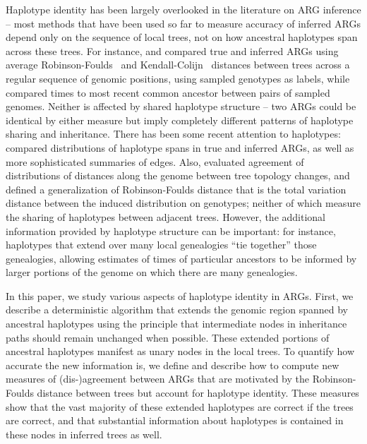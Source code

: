 \documentclass[10pt,twoside,lineno]{gsajnl}
\begin{document}
Haplotype identity has been largely overlooked in the literature on ARG inference --
most methods that have been used so far to measure accuracy of inferred ARGs
depend only on the sequence of local trees,
not on how ancestral haplotypes span across these trees.
For instance, \citet{kelleher2019inferring} and \citet{zhang2023biobankscale}
compared true and inferred ARGs
using average Robinson-Foulds~\citep{robinson1981comparison} and 
Kendall-Colijn~\citep{kendall2016mapping} distances between trees
across a regular sequence of genomic positions,
using sampled genotypes as labels,
while \citet{brandt2022evaluation} compared times to most recent common ancestor
between pairs of sampled genomes.
Neither is affected by shared haplotype structure --
two ARGs could be identical by either measure
but imply completely different patterns of haplotype sharing and inheritance.
There has been some recent attention to haplotypes:
\citet{ignatieva2024length} compared distributions of haplotype spans in true and inferred ARGs,
as well as more sophisticated summaries of edges.
Also, \citet{deng2021distribution} evaluated agreement of distributions of
distances along the genome between tree topology changes, and
\citet{zhang2023biobankscale} defined a generalization of Robinson-Foulds distance
that is the total variation distance between the induced distribution on genotypes;
neither of which measure the sharing of haplotypes between adjacent trees.
However, the additional information provided by haplotype structure can be important:
for instance, haplotypes that extend over many local genealogies
``tie together'' those genealogies, allowing estimates of times of particular ancestors
to be informed by larger portions of the genome on which there are many genealogies.

In this paper, we study various aspects of haplotype identity in ARGs.
First, we describe a deterministic algorithm that
extends the genomic region spanned by ancestral haplotypes
using the principle that intermediate nodes in inheritance paths
should remain unchanged when possible.
These extended portions of ancestral haplotypes manifest as unary nodes in the local trees.
To quantify how accurate the new information is,
we define and describe how to compute new measures of (dis-)agreement between ARGs
that are motivated by the Robinson-Foulds distance between trees
but account for haplotype identity.
These measures show that the vast majority of these extended haplotypes are correct if the trees are correct,
and that substantial information about haplotypes is contained in these nodes
in inferred trees as well.
\end{document}
